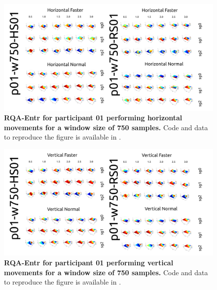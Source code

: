 \documentclass[12pt]{article}
\begin{document}
\newpage
\begin{figure}[ht!]
\centering
\includegraphics{figures/rqa/output/epsilons/rqa-epsilonsp01w750Horizontal}
    	\caption{
	{\bf RQA-Entr for participant 01 performing horizontal movements for a window size of 750 samples.}
	Code and data to reproduce the figure is available in \cite{srep2020}.
        }
    \label{fig-p01-H-w750}
\end{figure}
\begin{figure}[hb!]
\centering
\includegraphics{figures/rqa/output/epsilons/rqa-epsilonsp01w750Vertical}
    	\caption{
	{\bf RQA-Entr for participant 01 performing vertical movements for a window size of 750 samples.}
	Code and data to reproduce the figure is available in \cite{srep2020}.
        }
    \label{fig-p01-V-w750}
\end{figure}
\end{document}
